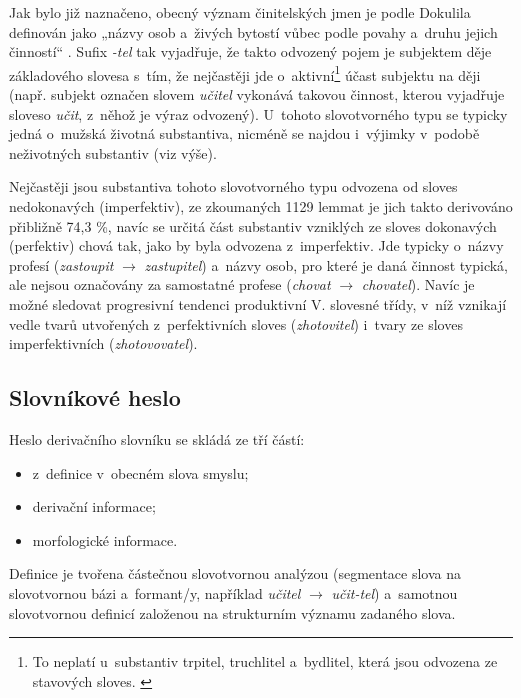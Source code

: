 Jak bylo již naznačeno, obecný význam činitelských jmen je podle
Dokulila definován jako „názvy osob a~živých bytostí vůbec podle povahy
a~druhu jejich činností`` \parencite[17]{dokulil67}. Sufix \emph{-tel}
tak vyjadřuje, že takto odvozený pojem je subjektem děje základového
slovesa s~tím, že nejčastěji jde
o~aktivní\footnote{To neplatí u~substantiv trpitel, truchlitel a~bydlitel, která jsou odvozena ze stavových sloves. \parencite[17]{dokulil67}}
účast subjektu na ději (např. subjekt označen slovem \emph{učitel}
vykonává takovou činnost, kterou vyjadřuje sloveso \emph{učit}, z~něhož
je výraz odvozený). U~tohoto slovotvorného typu se typicky jedná
o~mužská životná substantiva, nicméně se najdou i~výjimky v~podobě
neživotných substantiv (viz výše). \parencite{simandl2016}

Nejčastěji jsou substantiva tohoto slovotvorného typu odvozena od sloves
nedokonavých (imperfektiv), ze zkoumaných 1129 lemmat je jich takto
derivováno přibližně 74,3 \%, navíc se určitá část substantiv vzniklých
ze sloves dokonavých (perfektiv) chová tak, jako by byla odvozena
z~imperfektiv. Jde typicky o~názvy profesí (\emph{zastoupit}
$\rightarrow$ \emph{zastupitel}) a~názvy osob, pro které je daná
činnost typická, ale nejsou označovány za samostatné profese
(\emph{chovat} $\rightarrow$ \emph{chovatel}). Navíc je možné
sledovat progresivní tendenci produktivní V. slovesné třídy, v~níž
vznikají vedle tvarů utvořených z~perfektivních sloves
(\emph{zhotovitel}) i~tvary ze sloves imperfektivních
(\emph{zhotovovatel}). \parencite{adri}

\hypertarget{slovnuxedkovuxe9-heslo}{%
\subsection{Slovníkové heslo}\label{slovnuxedkovuxe9-heslo}}

Heslo derivačního slovníku se skládá ze tří částí:

\begin{itemize}
\tightlist
\item
  z~definice v~obecném slova smyslu;
\item
  derivační informace;
\item
  morfologické informace.
\end{itemize}

Definice je tvořena částečnou slovotvornou analýzou (segmentace slova na
slovotvornou bázi a~formant/y, například \emph{učitel} $\rightarrow$
\emph{učit-tel}) a~samotnou slovotvornou definicí založenou na
strukturním významu zadaného slova.

